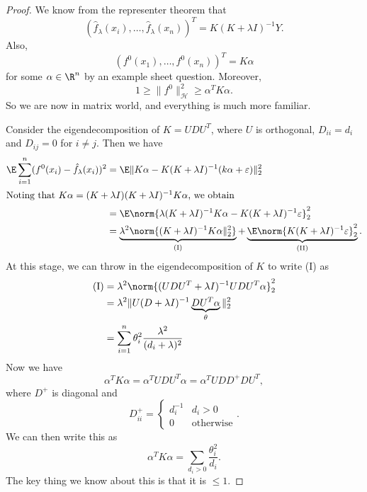 \documentclass[a4paper]{article}
\begin{document}
\begin{proof}
  We know from the representer theorem that
  \[
    (\hat{f}_\lambda (x_i), \ldots, \hat{f}_\lambda (x_n))^T = K(K + \lambda I)^{-1} Y.
  \]
  Also,
  \[
    (f^0(x_1), \ldots, f^0(x_n))^T = K \alpha
  \]
  for some $\alpha \in \R^n$ by an example sheet question. Moreover,
  \[
    1 \geq \|f^0\|_{\mathcal{H}}^2 \geq \alpha^T K \alpha.
  \]
  So we are now in matrix world, and everything is much more familiar.

  Consider the eigendecomposition of $K = UDU^T$, where $U$ is orthogonal, $D_{ii} = d_i$ and $D_{ij} = 0$ for $i \not= j$. Then we have
  \begin{align*}
    \E \sum_{i = 1}^n (f^0(x_i) - \hat{f}_\lambda (x_i))^2 &= \E\|K\alpha - K(K + \lambda I)^{-1} (k\alpha + \varepsilon)\|_2^2\\
    \intertext{Noting that $K\alpha= (K + \lambda I)(K + \lambda I)^{-1} K\alpha$, we obtain}
    &= \E \norm{\lambda (K + \lambda I)^{-1} K\alpha - K(K + \lambda I)^{-1} \varepsilon}_2^2\\
    &= \underbrace{\lambda^2 \norm{(K + \lambda I)^{-1} K\alpha\|_2^2}}_{\mathrm{(I)}} + \underbrace{\E \norm{K(K + \lambda I)^{-1} \varepsilon}_2^2}_{\mathrm{(II)}}.
  \end{align*}
  At this stage, we can throw in the eigendecomposition of $K$ to write (I) as
  \begin{align*}
    \mathrm{(I)} &= \lambda^2 \norm{(UDU^T + \lambda I)^{-1} UDU^T \alpha }_2^2\\
    &= \lambda^2 \|U (D + \lambda I)^{-1} \underbrace{D U^T \alpha}_{\theta} \|_2^2\\
    &= \sum_{i = 1}^n \theta_i^2 \frac{\lambda^2}{(d_i + \lambda)^2}
  \end{align*}
  Now we have
  \[
    \alpha^T K \alpha = \alpha^T U DU^T \alpha = \alpha^T U DD^+ DU^T,
  \]
  where $D^+$ is diagonal and
  \[
    D_{ii}^+ =
    \begin{cases}
      d_i^{-1} & d_i > 0\\
      0 & \text{otherwise}
    \end{cases}.
  \]
  We can then write this as
  \[
    \alpha^T K \alpha = \sum_{d_i > 0} \frac{\theta_i^2}{d_i}.
  \]
  The key thing we know about this is that it is $\leq 1$.


\end{proof}
\end{document}
